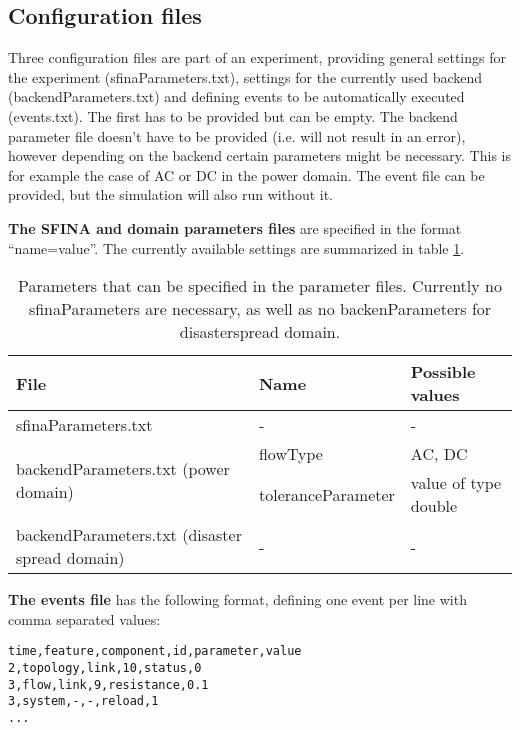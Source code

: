 \documentclass[11pt,fleqn]{book} %
\newcommand{\Backend}[1][]{Backend#1} %
\newcommand{\backend}[1][]{backend#1}
\newcommand{\domain}[1][]{domain#1}
\newcommand{\backendparameters}{domain parameters}
\newcommand{\backendParametersFile}{backendParameters.txt}
\newcommand{\sfinaParametersFile}{sfinaParameters.txt}
\begin{document}
\subsection{Configuration files}\index{\Backend{}}\label{subsec:config_files}
Three configuration files are part of an experiment, providing general settings for the experiment (\sfinaParametersFile{}), settings for the currently used \backend{} (\backendParametersFile{}) and defining events to be automatically executed (events.txt). The first has to be provided but can be empty. The backend parameter file doesn’t have to be provided (i.e. will not result in an error), however depending on the \backend{} certain parameters might be necessary. This is for example the case of AC or DC in the power \domain{}. The event file can be provided, but the simulation will also run without it. 

\textbf{The SFINA and \backendparameters{} files} are specified in the format “name=value”. The currently available settings are summarized in table \ref{table:params}.

\begin{table}[h]
\centering
\begin{tabular}{|l| l| l|}
\hline
\rowcolor{Gray}
File & Name & Possible values\\
\hline
{\sfinaParametersFile{}} & - & -\\ \hline
\multirow{2}{*}{\parbox{4cm}{\backendParametersFile{} (power \domain{})} } & flowType & AC, DC \\ 
\cline{2-3} & toleranceParameter & value of type double \\ \hline
\backendParametersFile{} (disaster spread \domain{}) & - & - \\ \hline
\end{tabular}
\label{table:params}
\caption{Parameters that can be specified in the parameter files. Currently no sfinaParameters are necessary, as well as no backenParameters for disaster\textunderscore spread \domain{}.}
\end{table}

\textbf{The events file} has the following format, defining one event per line with comma separated values:

\begin{lstlisting}[frame=single] 
time,feature,component,id,parameter,value
2,topology,link,10,status,0
3,flow,link,9,resistance,0.1
3,system,-,-,reload,1
...
\end{lstlisting}
\end{document}
